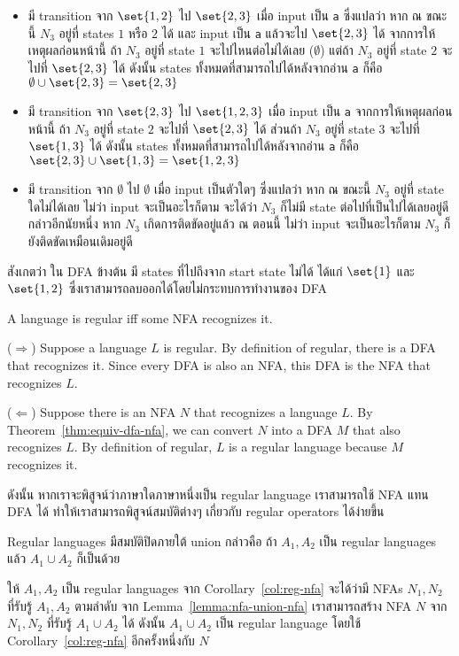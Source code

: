 \begin{example}
\begin{itemize}
\item มี transition จาก $\set{1,2}$ ไป $\set{2,3}$ เมื่อ input เป็น \texttt{a} ซึ่งแปลว่า หาก ณ ขณะนี้ $N_3$ อยู่ที่ states $1$ หรือ $2$ ได้ และ input เป็น \texttt{a} แล้วจะไป $\set{2,3}$ ได้ \enskip จากการให้เหตุผลก่อนหน้านี้ ถ้า $N_3$ อยู่ที่ state $1$ จะไปไหนต่อไม่ได้เลย ($\emptyset$) แต่ถ้า $N_3$ อยู่ที่ state $2$ จะไปที่ $\set{2,3}$ ได้ ดังนั้น states ทั้งหมดที่สามารถไปได้หลังจากอ่าน \texttt{a} ก็คือ $\emptyset\cup\set{2,3}=\set{2,3}$
\item มี transition จาก $\set{2,3}$ ไป $\set{1,2,3}$ เมื่อ input เป็น \texttt{a} \enskip จากการให้เหตุผลก่อนหน้านี้ ถ้า $N_3$ อยู่ที่ state $2$ จะไปที่ $\set{2,3}$ ได้ ส่วนถ้า $N_3$ อยู่ที่ state $3$ จะไปที่ $\set{1,3}$ ได้ ดังนั้น states ทั้งหมดที่สามารถไปได้หลังจากอ่าน \texttt{a} ก็คือ $\set{2,3}\cup\set{1,3}=\set{1,2,3}$
\item มี transition จาก $\emptyset$ ไป $\emptyset$ เมื่อ input เป็นตัวใดๆ ซึ่งแปลว่า หาก ณ ขณะนี้ $N_3$ อยู่ที่ state ใดไม่ได้เลย ไม่ว่า input จะเป็นอะไรก็ตาม จะได้ว่า $N_3$ ก็ไม่มี state ต่อไปที่เป็นไปได้เลยอยู่ดี \enskip กล่าวอีกนัยหนึ่ง หาก $N_3$ เกิดการติดขัดอยู่แล้ว ณ ตอนนี้ ไม่ว่า input จะเป็นอะไรก็ตาม $N_3$ ก็ยังติดขัดเหมือนเดิมอยู่ดี
\end{itemize}
สังเกตว่า ใน DFA ข้างต้น มี states ที่ไปถึงจาก start state ไม่ได้ ได้แก่ $\set{1}$ และ $\set{1,2}$ ซึ่งเราสามารถลบออกได้โดยไม่กระทบการทำงานของ DFA
\end{example}

\begin{corollary}\label{col:reg-nfa}
A language is regular iff some NFA recognizes it.
\begin{pf}
($\Rightarrow$) Suppose a language $L$ is regular.  By definition of regular, there is a DFA that recognizes it.  Since every DFA is also an NFA, this DFA is the NFA that recognizes $L$.

($\Leftarrow$) Suppose there is an NFA $N$ that recognizes a language $L$.  By Theorem~\ref{thm:equiv-dfa-nfa}, we can convert $N$ into a DFA $M$ that also recognizes $L$.  By definition of regular, $L$ is a regular language because $M$ recognizes it.
\end{pf}
\end{corollary}
ดังนั้น หากเราจะพิสูจน์ว่าภาษาใดภาษาหนึ่งเป็น regular language เราสามารถใช้ NFA แทน DFA ได้ ทำให้เราสามารถพิสูจน์สมบัติต่างๆ เกี่ยวกับ regular operators ได้ง่ายขึ้น

\begin{theorem}\label{thm:dfa-union-closed-nfa}
Regular languages มีสมบัติปิดภายใต้ union กล่าวคือ ถ้า $A_1,A_2$ เป็น regular languages แล้ว $A_1\cup A_2$ ก็เป็นด้วย
\begin{pf}
ให้ $A_1,A_2$ เป็น regular languages \enskip จาก Corollary~\ref{col:reg-nfa} จะได้ว่ามี NFAs $N_1,N_2$ ที่รับรู้ $A_1,A_2$ ตามลำดับ \enskip จาก Lemma~\ref{lemma:nfa-union-nfa} เราสามารถสร้าง NFA $N$ จาก $N_1,N_2$ ที่รับรู้ $A_1\cup A_2$ ได้ \enskip ดังนั้น $A_1\cup A_2$ เป็น regular language โดยใช้ Corollary~\ref{col:reg-nfa} อีกครั้งหนึ่งกับ $N$
\end{pf}
\end{theorem}

